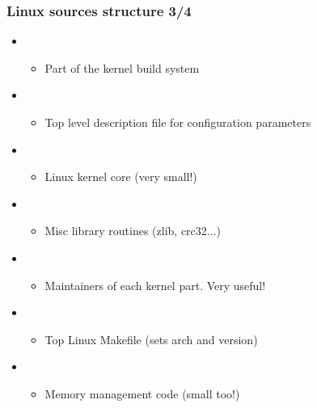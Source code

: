 \begin{frame}
  \frametitle{Linux sources structure 3/4}
  \begin{itemize}  
  \item {}
    \begin{itemize}
    \item Part of the kernel build system
    \end{itemize}
  \item {}
    \begin{itemize}
    \item Top level description file for configuration parameters
    \end{itemize}
  \item {}
    \begin{itemize}
    \item Linux kernel core (very small!)
    \end{itemize}
  \item {}
    \begin{itemize}
    \item Misc library routines (zlib, crc32...)
    \end{itemize}
  \item {}
    \begin{itemize}
    \item Maintainers of each kernel part. Very useful!
    \end{itemize}
  \item {}
    \begin{itemize}
    \item Top Linux Makefile (sets arch and version)
    \end{itemize}
  \item {}
    \begin{itemize}
    \item Memory management code (small too!)
    \end{itemize}
  \end{itemize}
\end{frame}

